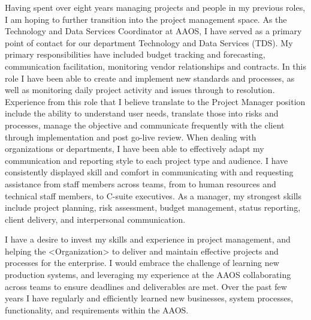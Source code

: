 \documentclass[9pt, a4paper]{awesome-cv}
\begin{document}
\makecvheader

\makelettertitle

\begin{cvletter}
Having spent over eight years managing projects and people in my previous roles, I am hoping to further transition into the project management space. As the Technology and Data Services Coordinator at AAOS, I have served as a primary point of contact for our department Technology and Data Services (TDS). My primary responsibilities have included budget tracking and forecasting, communication facilitation, monitoring vendor relationships and contracts. In this role I have been able to create and implement new standards and processes, as well as monitoring daily project activity and issues through to resolution. Experience from this role that I believe translate to the Project Manager position include the ability to understand user needs, translate those into risks and processes, manage the objective and communicate frequently with the client through implementation and post go-live review. When dealing with organizations or departments, I have been able to effectively adapt my communication and reporting style to each project type and audience. I have consistently displayed skill and comfort in communicating with and requesting assistance from staff members across teams, from to human resources and technical staff members, to C-suite executives. As a manager, my strongest skills include project planning, risk assessment, budget management, status reporting, client delivery, and interpersonal communication.

I have a desire to invest my skills and experience in project management, and helping the <Organization>  to deliver and maintain effective projects and processes for the enterprise. I would embrace the challenge of learning new production systems, and leveraging my experience at the AAOS collaborating across teams to ensure deadlines and deliverables are met. Over the past few years I have regularly and efficiently learned new businesses, system processes, functionality, and requirements within the AAOS.\\


\end{cvletter}
\end{document}
